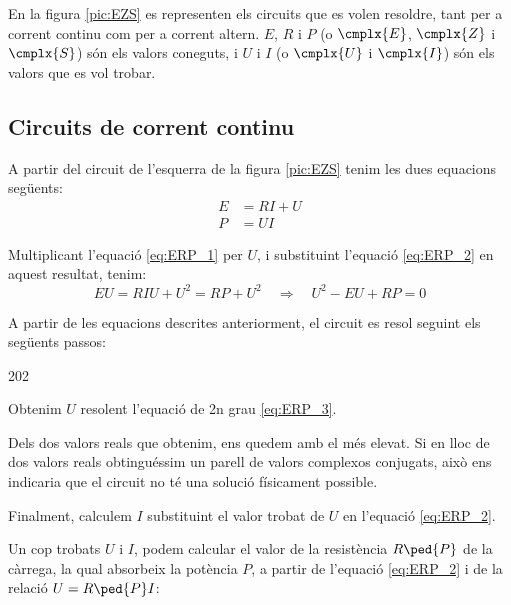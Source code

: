 En la figura \vref{pic:EZS} es representen els circuits que es volen
resoldre, tant per a corrent continu com per a corrent altern. $E$,
$R$ i $P$ (o $\cmplx{E}$, $\cmplx{Z}$ i $\cmplx{S}$) són els valors
coneguts, i $U$ i $I$ (o $\cmplx{U}$ i $\cmplx{I}$) són els valors
que es vol trobar.

\begin{center}
   
     \label{pic:EZS}
\end{center}

\subsection{Circuits de corrent continu}

A partir del circuit de l'esquerra de la figura \vref{pic:EZS} tenim les dues equacions següents:
\begin{align}
   E &= R I + U \label{eq:ERP_1} \\
   P &= U I     \label{eq:ERP_2}
\end{align}

Multiplicant l'equació \eqref{eq:ERP_1} per $U$, i substituint l'equació \eqref{eq:ERP_2} en aquest resultat, tenim:
\begin{equation}
   E U = R I U + U^2 = R P + U^2 \quad \Rightarrow \quad U^2 - E U + R P = 0 \label{eq:ERP_3}
\end{equation}

A partir de les equacions descrites anteriorment, el circuit es resol seguint els següents passos:
\begin{dingautolist}{202}
   \item Obtenim $U$ resolent l'equació de 2n grau \eqref{eq:ERP_3}.
   \item Dels dos valors reals que obtenim, ens quedem amb el més elevat. Si en lloc de dos valors reals obtinguéssim
   un parell de valors  complexos conjugats, això ens indicaria que el circuit no té una solució físicament possible.
   \item Finalment, calculem $I$ substituint el valor trobat de $U$ en l'equació \eqref{eq:ERP_2}.
\end{dingautolist}

Un cop trobats $U$ i $I$, podem calcular el valor de la resistència
$R\ped{P}$ de la càrrega, la qual absorbeix la potència $P$, a
partir de l'equació \eqref{eq:ERP_2} i de la relació $U =R\ped{P}
I$:

